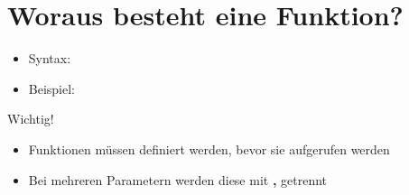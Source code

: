 



\subtitle{Kapitel 6: wie Funktionen funktionieren}
\titlegraphic{
	\begin{columns}
		\begin{column}{4cm}
			\vspace{1.5cm}
			\begin{center}
				{\huge Funktionen Syntax}
			\end{center}
		\end{column}
		\begin{column}{4cm}
		\vspace{-5mm}
			\begin{figure}
				\centering
			\end{figure}
		\end{column}
	\end{columns}}
\maketitle

\section{Woraus besteht eine Funktion?}
\begin{frame}
	\slidehead
	\vspace{-0.2cm}
	\begin{itemize}
		\item Syntax: 
		\pause
		\vspace{-0.05cm}
		\item Beispiel:
	\end{itemize}
	\vspace{-0.05cm}
	\pause
	\begin{block}{Wichtig!}
		\begin{itemize}
			\item Funktionen müssen definiert werden, bevor sie aufgerufen werden
			\item Bei mehreren Parametern werden diese mit \textbf{,} getrennt
		\end{itemize}
	\end{block}
\end{frame}

